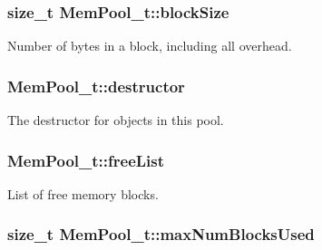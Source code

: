 \subsubsection[{\texorpdfstring{block\+Size}{blockSize}}]{\setlength{\rightskip}{0pt plus 5cm}size\+\_\+t Mem\+Pool\+\_\+t\+::block\+Size}\hypertarget{struct_mem_pool__t_a9b6fb86696cdc21313317f529e34a667}{}\label{struct_mem_pool__t_a9b6fb86696cdc21313317f529e34a667}


Number of bytes in a block, including all overhead. 

\subsubsection[{\texorpdfstring{destructor}{destructor}}]{ Mem\+Pool\+\_\+t\+::destructor}\hypertarget{struct_mem_pool__t_a73d209fbb8f55e0d6a939774613e62f9}{}\label{struct_mem_pool__t_a73d209fbb8f55e0d6a939774613e62f9}


The destructor for objects in this pool. 

\subsubsection[{\texorpdfstring{free\+List}{freeList}}]{ Mem\+Pool\+\_\+t\+::free\+List}\hypertarget{struct_mem_pool__t_ab80c40cdb81eb35850058377a698c229}{}\label{struct_mem_pool__t_ab80c40cdb81eb35850058377a698c229}


List of free memory blocks. 

\subsubsection[{\texorpdfstring{max\+Num\+Blocks\+Used}{maxNumBlocksUsed}}]{\setlength{\rightskip}{0pt plus 5cm}size\+\_\+t Mem\+Pool\+\_\+t\+::max\+Num\+Blocks\+Used}\hypertarget{struct_mem_pool__t_a45c35c9d71806c72b412e0f02ac465f7}{}\label{struct_mem_pool__t_a45c35c9d71806c72b412e0f02ac465f7}


